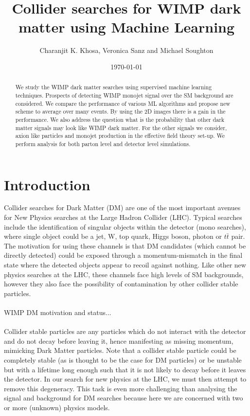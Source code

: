 \documentclass[aps,onecolumn,showpacs,superscriptaddress,groupedaddress,nofootinbib,preprint]{revtex4-1}
\begin{document}
\title{Collider searches for WIMP dark matter using Machine Learning}
\author{Charanjit K. Khosa, Veronica Sanz and Michael Soughton} 
\date{\today}
\begin{abstract}
We study the WIMP dark matter searches using supervised machine learning techniques. 
Prospects of detecting WIMP monojet signal over the SM background are considered. We compare the performance of 
various ML algorithms and propose new scheme to average over many events. By using the 2D images there is a gain in the performance.
We also address the question what is the probability that other dark matter signals may look like WIMP dark matter. For the other signals 
we consider, axion like particles and monojet production in the effective field theory set-up. We perform analysis for both parton level and detector level simulations.
\end{abstract}
\maketitle 

\section{Introduction}
\noindent Collider searches for Dark Matter (DM) are one of the most important avenues for New Physics searches at the Large Hadron Collider (LHC). Typical searches include the identification of singular objects within the detector (mono searches), where single object could be a jet, W, top quark, Higgs boson, photon or $ t \bar t $ pair. The motivation for using these channels is that DM candidates (which cannot be directly detected) could be exposed through a momentum-mismatch in the final state where the detected objects appear to recoil against nothing. Like other new physics searches at the LHC, these channels face high levels of SM backgrounds, however they also face the possibility of contamination by other collider stable particles.
\\
\\
WIMP DM motivation and status...
\\
\\
Collider stable particles are any particles which do not interact with the detector and do not decay before leaving it, hence manifesting as missing momentum, mimicking Dark Matter particles. Note that a collider stable particle could be completely stable (as is thought to be the case for DM particles) or be unstable but with a lifetime long enough such that it is not likely to decay before it leaves the detector. In our search for new physics at the LHC, we must then attempt to remove this degeneracy. This task is even more challenging than analysing the signal and background for DM searches because here we are concerned with two or more (unknown) physics models. 
\end{document}
